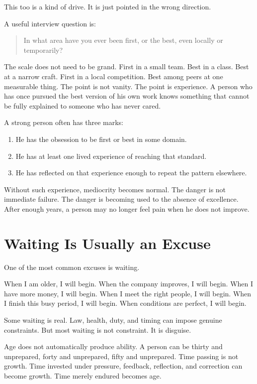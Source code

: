 This too is a kind of drive. It is just pointed in the wrong direction.

A useful interview question is:

\begin{quote}
In what area have you ever been first, or the best, even locally or temporarily?
\end{quote}

The scale does not need to be grand. First in a small team. Best in a class. Best at a narrow craft. First in a local competition. Best among peers at one measurable thing. The point is not vanity. The point is experience. A person who has once pursued the best version of his own work knows something that cannot be fully explained to someone who has never cared.

A strong person often has three marks:

\begin{enumerate}
\item He has the obsession to be first or best in some domain.
\item He has at least one lived experience of reaching that standard.
\item He has reflected on that experience enough to repeat the pattern elsewhere.
\end{enumerate}

Without such experience, mediocrity becomes normal. The danger is not immediate failure. The danger is becoming used to the absence of excellence. After enough years, a person may no longer feel pain when he does not improve.

\section*{Waiting Is Usually an Excuse}

One of the most common excuses is waiting.

When I am older, I will begin. When the company improves, I will begin. When I have more money, I will begin. When I meet the right people, I will begin. When I finish this busy period, I will begin. When conditions are perfect, I will begin.

Some waiting is real. Law, health, duty, and timing can impose genuine constraints. But most waiting is not constraint. It is disguise.

Age does not automatically produce ability. A person can be thirty and unprepared, forty and unprepared, fifty and unprepared. Time passing is not growth. Time invested under pressure, feedback, reflection, and correction can become growth. Time merely endured becomes age.

